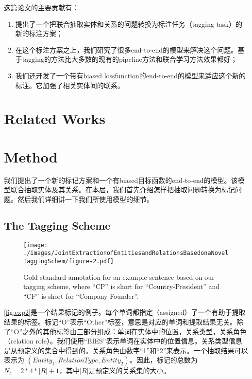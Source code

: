 \documentclass[a4paper,UTF8,no-math]{ctexart}
\begin{document}
	这篇论文的主要贡献有：\begin{enumerate}
		\item 提出了一个把联合抽取实体和关系的问题转换为标注任务（tagging task）的新的标注方案；
		\item 在这个标注方案之上，我们研究了很多end-to-end的模型来解决这个问题。基于tagging的方法比大多数的现有的pipeline方法和联合学习方法效果都好；
		\item 我们还开发了一个带有biased lossfunction的end-to-end的模型来适应这个新的标注。它加强了相关实体间的联系。
	\end{enumerate}
	
	
	\section{Related Works}
	
	\section{Method}
	
	我们提出了一个新的标记方案和一个有biased目标函数的end-to-end的模型。该模型联合抽取实体及其关系。在本届，我们首先介绍怎样把抽取问题转换为标记问题。然后我们详细讲一下我们所使用模型的细节。
	
	\subsection{The Tagging Scheme}
	
	\begin{figure*}
		\begin{center}
			\texttt{[image: ./images/JointExtractionofEntitiesandRelationsBasedonaNovelTaggingSchem/figure-2.pdf]}
			\caption{\label{fig:exp2}Gold standard annotation for an example sentence based on our tagging scheme, where ``CP'' is short for ``Country-President'' and ``CF'' is short for ``Company-Founder''.}
		\end{center}
	\end{figure*}

	\autoref{fig:exp2}是一个结果标记的例子。每个单词都指定（assigned）了一个有助于提取结果的标签。标记“O”表示“Other”标签，意思是对应的单词和提取结果无关。除了“O”之外的其他标签由三部分组成：单词在实体中的位置，关系类型，关系角色（relation role）。我们使用“BIES”表示单词在实体中的位置信息。关系类型信息是从预定义的集合中得到的。关系角色由数字“1”和“2”来表示。一个抽取结果可以表示为 $(Entity_1,RelationType,Entity_2)$。因此，标记的总数为$N_t = 2*4*|R|+1$，其中$|R|$是预定义的关系集的大小。
	
\end{document}

